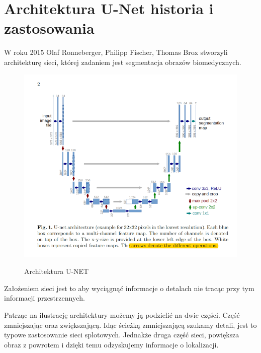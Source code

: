 \documentclass{article}
\begin{document}
\section{Architektura U-Net historia i zastosowania}
W roku 2015 Olaf Ronneberger, Philipp Fischer, Thomas Brox stworzyli architekturę sieci, której zadaniem jest segmentacja obrazów biomedycznych\cite{unetpaper}.
\begin{figure}[H]
    \centering
    \includegraphics[width=\linewidth]{images/unet.png}
    \caption{Architektura U-NET}
    \cite{unet}
    \label{Wizualizacja architektury U-NET}
\end{figure}
Założeniem sieci jest to aby wyciągnąć informacje o detalach nie tracąc przy tym informacji przestrzennych.

Patrząc na ilustrację architektury możemy ją podzielić na dwie części. Część zmniejszając oraz zwiększającą.
Idąc ścieżką zmniejszającą szukamy detali, jest to typowe zastosowanie sieci splotowych. Jednakże druga część sieci, powiększa obraz z powrotem i dzięki temu odzyskujemy informacje o lokalizacji.

\newpage
\end{document}
